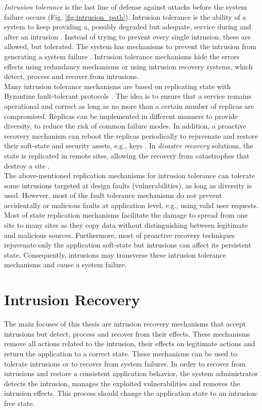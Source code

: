 \emph{Intrusion tolerance} is the last line of defense against attacks before the system failure occurs (Fig. \ref{fig:intrusion_path}). Intrusion tolerance is the ability of a system to keep providing a, possibly degraded but adequate, service during and after an intrusion \cite{Stavridou2001a}. Instead of trying to prevent every single intrusion, these are allowed, but tolerated. The system has mechanisms to prevent the intrusion from generating a system failure \cite{Verissimo2003}. Intrusion tolerance mechanisms hide the errors effects using redundancy mechanisms or using intrusion recovery systems, which detect, process and recover from intrusions.\\

Many intrusion tolerance mechanisms are based on replicating state with Byzantine fault-tolerant protocols \cite{Schneider1990,Castro2002,Veronese2011}. The idea is to ensure that a service remains operational and correct as long as no more than a certain number of replicas are compromised. Replicas can be implemented in different manners to provide diversity, to reduce the risk of common failure modes. In addition, a proactive recovery mechanism can reboot the replicas periodically to rejuvenate and restore their soft-state and security assets, e.g., keys \cite{Candea2001,Castro2002,Sousa2010}. In \emph{disaster recovery} solutions, the state is replicated in remote sites, allowing the recovery from catastrophes that destroy a site \cite{cloud-disaster}.\\

The above-mentioned replication mechanisms for intrusion tolerance can tolerate some intrusions targeted at design faults (vulnerabilities), as long as diversity is used. However, most of the fault tolerance mechanisms do not prevent accidentally or malicious faults at application level, e.g., using valid user requests. Most of state replication mechanisms facilitate the damage to spread from one site to many sites as they copy data without distinguishing between legitimate and malicious sources. Furthermore, most of proactive recovery techniques rejuvenate only the application soft-state but intrusions can affect its persistent state. Consequently, intrusions may transverse these intrusion tolerance mechanisms and cause a system failure. 


\section{Intrusion Recovery}
\label{sec:related:recovery}
The main focuses of this thesis are intrusion recovery mechanisms that accept intrusions but detect, process and recover from their effects. These mechanisms remove all actions related to the intrusion, their effects on legitimate actions and return the application to a correct state. These mechanisms can be used to tolerate intrusions or to recover from system failures. In order to recover from intrusions and restore a consistent application behavior, the system administrator detects the intrusion, manages the exploited vulnerabilities and removes the intrusion effects. This process should change the application state to an intrusion-free state.\\

